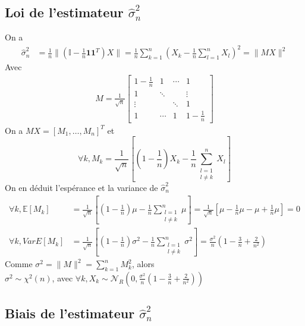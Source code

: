 \documentclass{report}
\begin{document}
		\subsection{Loi de l'estimateur $\hat\sigma^2_n$}
			On a
			\begin{align*}
				\hat\sigma^2_n &= \frac{1}{n} \lVert (\mathbb{I} - \frac{1}{n}\textbf{1}\textbf{1}^T)X \rVert = \frac{1}{n} \sum\limits_{k=1}^n (X_k - \frac{1}{n}\sum\limits_{l=1}^n X_l)^2 = \lVert MX \rVert^2
			\end{align*}
			Avec
			\begin{align*}
				M = \frac{1}{\sqrt n}
				\left[
				\begin{array}{cccc}
					1-\frac{1}{n} & 1 & \cdots & 1 \\
					1 & \ddots & & \vdots \\
					\vdots & & \ddots & 1 \\
					1 &  \cdots & 1 & 1-\frac{1}{n}
				\end{array}
				\right]
			\end{align*}
			On a $MX = [M_1, \ldots, M_n]^T$ et
			\[ \forall k, M_k = \frac{1}{\sqrt n}[ (1-\frac{1}{n})X_k -\frac{1}{n}\sum\limits_{\substack{
            l=1\\
            l \neq k}}^n X_l ] \]
            On en déduit l'espérance et la variance de $\hat\sigma^2_n$\\
            \begin{align*}
            	\forall k, \mathbb{E}[M_k] &= \frac{1}{\sqrt n}[(1-\frac{1}{n})\mu - \frac{1}{n}\sum\limits_{\substack{
            	l=1\\
            	l \neq k}}^n \mu] = \frac{1}{\sqrt n}[ \mu - \frac{1}{n}\mu - \mu + \frac{1}{n}\mu ] = 0 \\
            	\forall k, Var{E}[M_k] &= \frac{1}{\sqrt n}[(1-\frac{1}{n})\sigma^2 - \frac{1}{n}\sum\limits_{\substack{
            	l=1\\
            	l \neq k}}^n \sigma^2] = \frac{\sigma^2}{n}(1-\frac{3}{n}+\frac{2}{n^2})
            \end{align*}
            Comme $\sigma^2 = \lVert M \rVert^2 = \sum\limits_{k=1}^n M_k^2$, alors \\
            $\sigma^2 \sim \chi^2(n)$, avec $\forall k, X_k \sim \mathcal{N}_{R}(0, \frac{\sigma^2}{n}(1-\frac{3}{n}+\frac{2}{n^2}))$
		\subsection{Biais de l'estimateur $\hat\sigma^2_n$}
\end{document}
